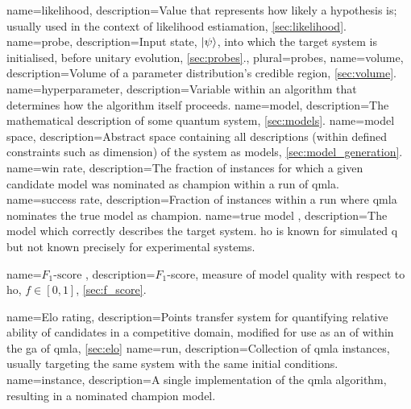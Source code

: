 {
    name=likelihood,
    description={Value that represents how likely a hypothesis is; usually used in the context of likelihood estiamation, \cref{sec:likelihood}.}
}
{
    name=probe,
    description={Input state, $\ket{\psi}$, into which the target system is initialised, before unitary evolution, \cref{sec:probes}.},
    plural={probes},
}
{
    name=volume,
    description={Volume of a parameter distribution's credible region, \cref{sec:volume}.}
}
{
    name=hyperparameter,
    description={Variable within an algorithm that determines how the algorithm itself proceeds.}
}
{
    name=model,
    description={The mathematical description of some quantum system, \cref{sec:models}.}
}
{
    name=model space,
    description={Abstract space containing all descriptions (within defined constraints such as dimension) of the system as \glspl{model}, \cref{sec:model_generation}.}
}
{
    name=win rate,
    description={The fraction of \glspl{instance} for which a given candidate \gls{model} was nominated as \gls{champion}
        within a \gls{run} of \acrshort{qmla}.
    }
}
{
    name=success rate,
    description={Fraction of \glspl{instance} within a \gls{run} where \acrshort{qmla} nominates the \gls{true model} as \gls{champion}.}
}
{
    name={true model} ,
    description={The model which correctly describes the target system. 
        \gls{ho} is known for simulated \gls{q} but not known precisely for experimental systems.
    }
}

{
    name={\ensuremath{F_{1}\text{-score} }} ,
    description={$F_1$-score, measure of model quality with respect to \gls{ho}, $f \in \left[0, 1\right]$, \cref{sec:f_score}.}
}

{
    name={Elo rating},
    description={Points transfer system for quantifying relative ability of candidates in a competitive domain, 
        modified for use as an \acrlong{of} within the \acrlong{ga} of \acrshort{qmla}, \cref{sec:elo} 
    }
}
{
    name=run,
    description={Collection of \acrshort{qmla} \glspl{instance}, usually targeting the same system with the same initial conditions.}
}
{
    name=instance,
    description={A single implementation of the \acrshort{qmla} algorithm, resulting in a nominated \gls{champion model}.}
}

